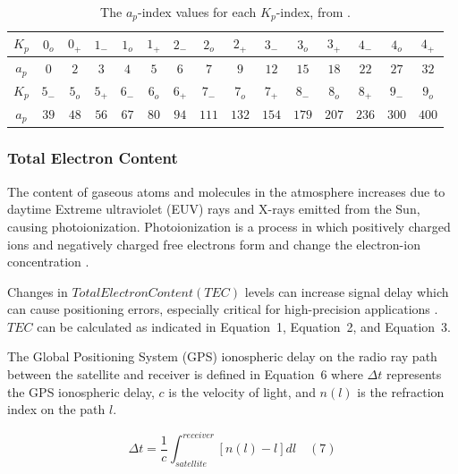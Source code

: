 \documentclass[sn-mathphys-num]{sn-jnl}%
\begin{document}
\begin{table}[!ht]
    \centering
    \caption{The $a_{p}$-index values for each $K_{p}$-index, from \cite{NOAA2024gGeomagneticIndices}.}
    \label{tab:ap}
    \begin{tabular}{|c|c|c|c|c|c|c|c|c|c|c|c|c|c|c|}
        \hline
        $K_{p}$ & $0_{o}$ & $0_{+}$ & $1_{-}$ & $1_{o}$ & $1_{+}$ & $2_{-}$ & $2_{o}$ & $2_{+}$ & $3_{-}$ & $3_{o}$ & $3_{+}$ & $4_{-}$ & $4_{o}$ & $4_{+}$ \\ \hline
        $a_{p}$ & $0$ & $2$ & $3$ & $4$ & $5$ & $6$ & $7$ & $9$ & $12$ & $15$ & $18$ & $22$ & $27$ & $32$ \\ \hline
        $K_{p}$ & $5_{-}$ & $5_{o}$ & $5_{+}$ & $6_{-}$ & $6_{o}$ & $6_{+}$ & $7_{-}$ & $7_{o}$ & $7_{+}$ & $8_{-}$ & $8_{o}$ & $8_{+}$ & $9_{-}$ & $9_{o}$ \\ \hline
        $a_{p}$ & $39$ & $48$ & $56$ & $67$ & $80$ & $94$ & $111$ & $132$ & $154$ & $179$ & $207$ & $236$ & $300$ & $400$ \\ \hline
 \end{tabular}
\end{table}

\subsubsection{Total Electron Content}

The content of gaseous atoms and molecules in the atmosphere increases due to daytime Extreme ultraviolet (EUV) rays and X-rays emitted from the Sun, causing photoionization. Photoionization is a process in which positively charged ions and negatively charged free electrons form and change the electron-ion concentration \cite{prolss2012physics}.

Changes in $Total Electron Content (TEC)$ levels \cite{liu2009seismoionospheric} can increase signal delay which can cause positioning errors, especially critical for high-precision applications \cite{durmaz2015regional, jin2012m_dcb}. $TEC$ can be calculated as indicated in Equation~1, Equation~2, and Equation~3. 

The Global Positioning System (GPS) ionospheric delay \cite{schaer1999mapping} on the radio ray path between the satellite and receiver is defined in Equation~6 \cite{spilker1996global} where $\Delta t$ represents the GPS ionospheric delay, $c$ is the velocity of light, and $n(l)$ is the refraction index on the path $l$.

\begin{equation}
	\Delta t = \frac{1}{c} \int_{satellite}^{receiver} \left[ n(l) - l \right]dl
	\quad\left(7\right)
\end{equation}
\end{document}
